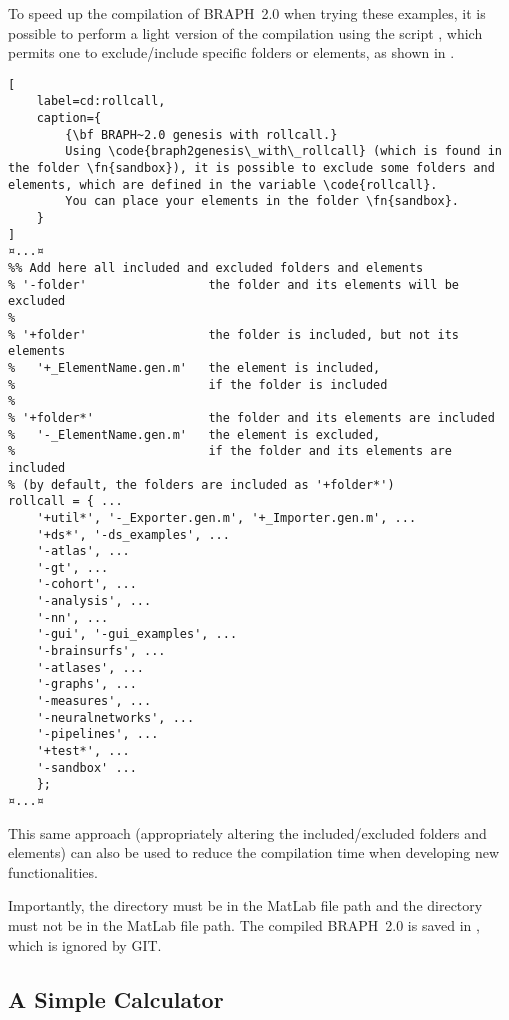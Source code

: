 \documentclass{tufte-handout}
\begin{document}
\begin{fullwidth}
\begin{tcolorbox}[
	title=Light compilation of BRAPH~2.0
]
To speed up the compilation of BRAPH~2.0 when trying these examples, it is possible to perform a light version of the compilation using the script , which permits one to exclude/include specific folders or elements, as shown in .
%
\begin{lstlisting}[
	label=cd:rollcall,
	caption={
		{\bf BRAPH~2.0 genesis with rollcall.}
		Using \code{braph2genesis\_with\_rollcall} (which is found in the folder \fn{sandbox}), it is possible to exclude some folders and elements, which are defined in the variable \code{rollcall}.
		You can place your elements in the folder \fn{sandbox}.
	}
]
¤...¤
%% Add here all included and excluded folders and elements
% '-folder'                 the folder and its elements will be excluded
%
% '+folder'                 the folder is included, but not its elements
%   '+_ElementName.gen.m'   the element is included,
%                           if the folder is included
%
% '+folder*'                the folder and its elements are included
%   '-_ElementName.gen.m'   the element is excluded,
%                           if the folder and its elements are included
% (by default, the folders are included as '+folder*')
rollcall = { ...
    '+util*', '-_Exporter.gen.m', '+_Importer.gen.m', ...
    '+ds*', '-ds_examples', ...
    '-atlas', ...
    '-gt', ...
    '-cohort', ...
    '-analysis', ...
    '-nn', ...
    '-gui', '-gui_examples', ...
    '-brainsurfs', ...
    '-atlases', ...
    '-graphs', ...
    '-measures', ...
    '-neuralnetworks', ...
    '-pipelines', ...
    '+test*', ...
    '-sandbox' ...
    };
¤...¤
\end{lstlisting}

This same approach (appropriately altering the included/excluded folders and elements) can also be used to reduce the compilation time when developing new functionalities.

Importantly, the directory  must be in the MatLab file path and the directory  must not be in the MatLab file path.
The compiled BRAPH~2.0 is saved in , which is ignored by GIT.
\end{tcolorbox}
\end{fullwidth}

\subsection{A Simple Calculator}
\end{document}

